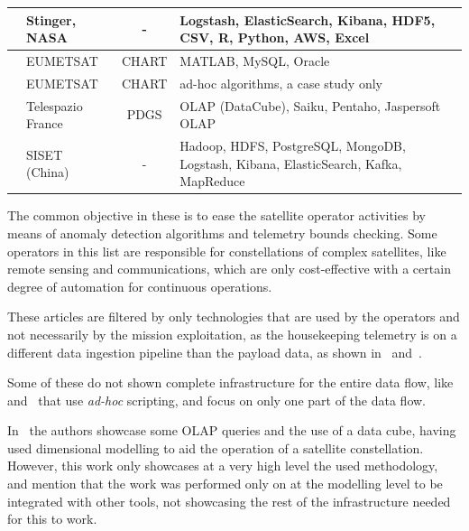 \begin{table}[htbp]
\begin{center}
\begin{tabular}{|C{11em}|C{6em}|c|C{10em}|}
      \hline
      \cite{mateikUsingBigData2017}                  & Stinger, NASA      & -                    & Logstash, ElasticSearch, Kibana, HDF5, CSV, R, Python, AWS, Excel                    \\
      \hline
      \cite{schulsterCHARTingFutureOffline2018}      & EUMETSAT           & CHART                & MATLAB, MySQL, Oracle                                                                \\
      \hline
      \cite{trollopeAnalysisAutomatedTechniques2018} & EUMETSAT           & CHART                & ad-hoc algorithms, a case study only \\
      \hline
      \cite{yvernesCopernicusGroundSegment2018}      & Telespazio France  & PDGS                 & OLAP (DataCube), Saiku, Pentaho, Jaspersoft OLAP                                     \\
      \hline
      \cite{zhangBigDataFramework2017}               & SISET (China)      & -                    & Hadoop, HDFS, PostgreSQL, MongoDB, Logstash, Kibana, ElasticSearch, Kafka, MapReduce \\
      \hline
    \end{tabular}
  \end{center}
\end{table}

The common objective in these is to ease the satellite operator activities by means of anomaly detection algorithms and telemetry bounds checking.
Some operators in this list are responsible for constellations of complex satellites, like remote sensing and communications, which are only cost-effective with a certain degree of automation for continuous operations.

These articles are filtered by only technologies that are used by the operators and not necessarily by the mission exploitation, as the housekeeping telemetry is on a different data ingestion pipeline than the payload data, as shown in~\cite{mateikUsingBigData2017} and~\cite{adamskiDataAnalyticsLarge2016}.

Some of these do not shown complete infrastructure for the entire data flow, like~\cite{fernandezTelemetryAnomalyDetection2017} and~\cite{trollopeAnalysisAutomatedTechniques2018} that use \textit{ad-hoc} scripting, and focus on only one part of the data flow.

In~\cite{yvernesCopernicusGroundSegment2018} the authors showcase some OLAP queries and the use of a data cube, having used dimensional modelling to aid the operation of a satellite constellation. However, this work only showcases at a very high level the used methodology, and mention that the work was performed only on at the modelling level to be integrated with other tools, not showcasing the rest of the infrastructure needed for this to work.

